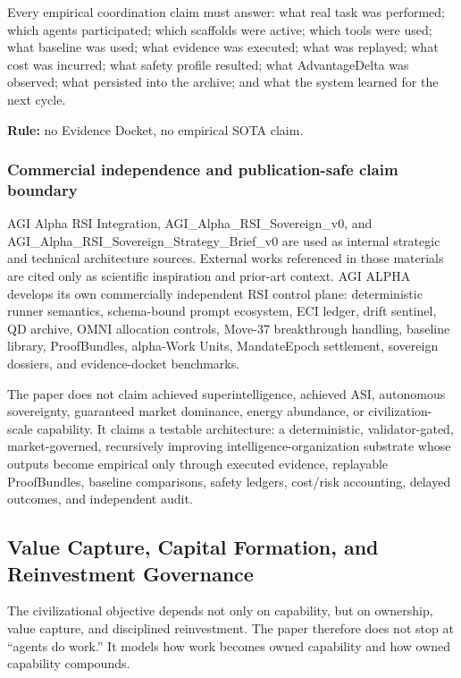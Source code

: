 Every empirical coordination claim must answer: what real task was
performed; which agents participated; which scaffolds were active; which
tools were used; what baseline was used; what evidence was executed;
what was replayed; what cost was incurred; what safety profile resulted;
what AdvantageDelta was observed; what persisted into the archive; and
what the system learned for the next cycle.

\textbf{Rule:} no Evidence Docket, no empirical SOTA claim.

\subsubsection{Commercial independence and publication-safe claim
boundary}\label{commercial-independence-and-publication-safe-claim-boundary}

AGI Alpha RSI Integration, AGI\_Alpha\_RSI\_Sovereign\_v0, and
AGI\_Alpha\_RSI\_Sovereign\_Strategy\_Brief\_v0 are used as internal
strategic and technical architecture sources. External works referenced
in those materials are cited only as scientific inspiration and
prior-art context. AGI ALPHA develops its own commercially independent
RSI control plane: deterministic runner semantics, schema-bound prompt
ecosystem, ECI ledger, drift sentinel, QD archive, OMNI allocation
controls, Move-37 breakthrough handling, baseline library, ProofBundles,
alpha-Work Units, MandateEpoch settlement, sovereign dossiers, and
evidence-docket benchmarks.

The paper does not claim achieved superintelligence, achieved ASI,
autonomous sovereignty, guaranteed market dominance, energy abundance,
or civilization-scale capability. It claims a testable architecture: a
deterministic, validator-gated, market-governed, recursively improving
intelligence-organization substrate whose outputs become empirical only
through executed evidence, replayable ProofBundles, baseline
comparisons, safety ledgers, cost/risk accounting, delayed outcomes, and
independent audit.

\subsection{Value Capture, Capital Formation, and Reinvestment
Governance}\label{value-capture-capital-formation-and-reinvestment-governance}

The civilizational objective depends not only on capability, but on
ownership, value capture, and disciplined reinvestment. The paper
therefore does not stop at ``agents do work.'' It models how work
becomes owned capability and how owned capability compounds.


